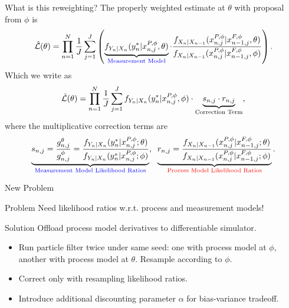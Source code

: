\documentclass{beamer}
\begin{document}
\begin{frame}{What is this reweighting?}
    The properly weighted estimate at $\theta$ with proposal from $\phi$ is 
    $$\hat{\mathcal{L}}(\theta) = \prod_{n=1}^N \frac{1}{J} \sum_{j=1}^J \left(\underbrace{f_{Y_n|X_n}(y_n^* | x_{n,j}^{P,\phi}, \theta)}_{\textcolor{blue}{\text{Measurement Model}}}
    \cdot 
    \frac{f_{X_n|X_{n-1}}(x_{n,j}^{P, \phi} | x_{n-1,j}^{F,\phi}, \theta)}{f_{X_n|X_{n-1}}(x_{n,j}^{P, \phi} | x_{n-1,j}^{F,\phi}, \phi)}
    \right).$$
    \pause
    Which we write as
        $$
        \hat{\mathcal{L}}(\theta) 
        = \prod_{n=1}^N \frac{1}{J} \sum_{j=1}^J f_{Y_n|X_n}(y_n^* | x_{n,j}^{P,\phi}, \phi) 
        \cdot \underbrace{s_{n,j} \cdot r_{n,j}}_{\text{Correction Term}},
    $$
    \pause
    where the multiplicative correction terms are
    $$
        \underbrace{s_{n,j}=\frac{g_{n,j}^\theta}{g_{n,j}^{\phi}}=\frac{f_{Y_n|X_n}(y_n^*|x_{n,j}^{P, \phi}; \theta)}{f_{Y_n|X_n}(y_n^*|x_{n,j}^{P,\phi}; \phi)}}_{\textcolor{blue}{\text{Measurement Model Likelihood Ratios}}},\;\; \underbrace{r_{n,j}=\frac{f_{X_n|X_{n-1}}(x_{n,j}^{P, \phi}|x_{n-1,j}^{F, \phi}; \theta)}{f_{X_n|X_{n-1}}(x_{n,j}^{P, \phi}|x_{n-1,j}^{F, \phi}; \phi)}}_{\textcolor{red}{\text{Process Model Likelihood Ratios}}}.
    $$
        
\end{frame}

\begin{frame}{New Problem}
    \begin{block}{Problem}
        Need likelihood ratios w.r.t. process and measurement models!
    \end{block}
    \pause 
    \begin{block}{Solution}
        Offload process model derivatives to differentiable simulator. 
    \end{block}
    \begin{itemize}
        \item \pause Run particle filter twice under same seed: one with process model at $\phi$, another with process model at $\theta$. Resample according to $\phi$.
        \item \pause Correct only with resampling likelihood ratios. 
        \item \pause Introduce additional discounting parameter $\alpha$ for bias-variance tradeoff.
    \end{itemize}
\end{frame}
\end{document}
